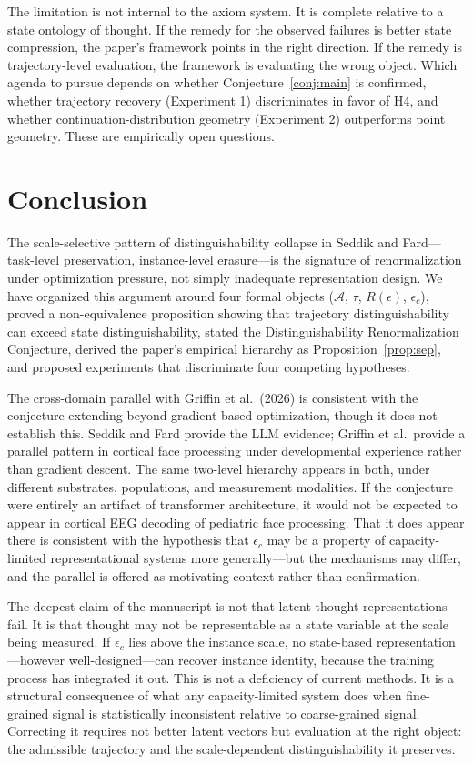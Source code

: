 \documentclass[11pt]{article}
\begin{document}
The limitation is not internal to the axiom system. It is complete relative to a state ontology
of thought. If the remedy for the observed failures is better state compression, the paper's
framework points in the right direction. If the remedy is trajectory-level evaluation, the
framework is evaluating the wrong object. Which agenda to pursue depends on whether
Conjecture~\ref{conj:main} is confirmed, whether trajectory recovery (Experiment 1)
discriminates in favor of H4, and whether continuation-distribution geometry (Experiment 2)
outperforms point geometry. These are empirically open questions.

\section{Conclusion}

The scale-selective pattern of distinguishability collapse in Seddik and Fard---task-level
preservation, instance-level erasure---is the signature of renormalization under optimization
pressure, not simply inadequate representation design. We have organized this argument around
four formal objects ($\mathcal{A}$, $\tau$, $R(\epsilon)$, $\epsilon_c$), proved a
non-equivalence proposition showing that trajectory distinguishability can exceed state
distinguishability, stated the Distinguishability Renormalization Conjecture, derived the paper's
empirical hierarchy as Proposition~\ref{prop:sep}, and proposed experiments that discriminate
four competing hypotheses.

The cross-domain parallel with Griffin et al.\ (2026) is consistent with the conjecture extending
beyond gradient-based optimization, though it does not establish this. Seddik and Fard provide
the LLM evidence; Griffin et al.\ provide a parallel pattern in cortical face processing under
developmental experience rather than gradient descent. The same two-level hierarchy appears in
both, under different substrates, populations, and measurement modalities. If the conjecture
were entirely an artifact of transformer architecture, it would not be expected to appear in
cortical EEG decoding of pediatric face processing. That it does appear there is consistent
with the hypothesis that $\epsilon_c$ may be a property of capacity-limited representational
systems more generally---but the mechanisms may differ, and the parallel is offered as
motivating context rather than confirmation.

The deepest claim of the manuscript is not that latent thought representations fail. It is that
thought may not be representable as a state variable at the scale being measured. If $\epsilon_c$
lies above the instance scale, no state-based representation---however well-designed---can
recover instance identity, because the training process has integrated it out. This is not a
deficiency of current methods. It is a structural consequence of what any capacity-limited
system does when fine-grained signal is statistically inconsistent relative to coarse-grained
signal. Correcting it requires not better latent vectors but evaluation at the right object:
the admissible trajectory and the scale-dependent distinguishability it preserves.
\end{document}
